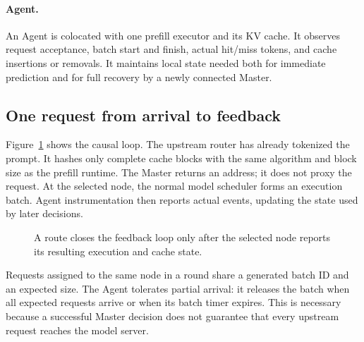 \documentclass[10pt]{article}
\begin{document}
\paragraph{Agent.}
An Agent is colocated with one prefill executor and its KV cache. It observes
request acceptance, batch start and finish, actual hit/miss tokens, and cache
insertions or removals. It maintains local state needed both for immediate
prediction and for full recovery by a newly connected Master.

\subsection{One request from arrival to feedback}

Figure~\ref{fig:request-path} shows the causal loop. The upstream router has
already tokenized the prompt. It hashes only complete cache blocks with the
same algorithm and block size as the prefill runtime. The Master returns an
address; it does not proxy the request. At the selected node, the normal model
scheduler forms an execution batch. Agent instrumentation then reports actual
events, updating the state used by later decisions.

\begin{figure}[t]
\centering
{}
\caption{A route closes the feedback loop only after the selected node
reports its resulting execution and cache state.}
\label{fig:request-path}
\end{figure}

Requests assigned to the same node in a round share a generated batch ID and
an expected size. The Agent tolerates partial arrival: it releases the batch
when all expected requests arrive or when its batch timer expires. This is
necessary because a successful Master decision does not guarantee that every
upstream request reaches the model server.
\end{document}
